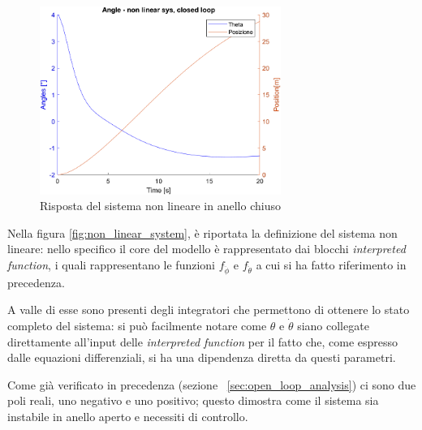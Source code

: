\begin{figure}[H]
	\centering   	
	\includegraphics[width=0.7\textwidth]{Immagini/closed_loop_non_linear.png}
	\caption{Risposta del sistema non lineare in anello chiuso}
	\label{fig:closed_loop_non_linear_response}
\end{figure}

Nella figura \ref{fig:non_linear_system}, è riportata la definizione del sistema non lineare: nello specifico il core del modello è rappresentato dai blocchi \textit{interpreted function}, i quali rappresentano le funzioni  $f_{\ddot{\phi}}$ e $f_{\ddot{\theta}}$ a cui si ha fatto riferimento in precedenza.

A valle di esse sono presenti degli integratori che permettono di ottenere lo stato completo del sistema: si può facilmente notare come $\theta$ e $\dot{\theta}$ siano collegate direttamente all'input delle \textit{interpreted function} per il fatto che, come espresso dalle equazioni differenziali, si ha una dipendenza diretta da questi parametri.

Come già verificato in precedenza (sezione ~\ref{sec:open_loop_analysis}) ci sono due poli reali, uno negativo e uno positivo; questo dimostra come il sistema sia instabile in anello aperto e necessiti di controllo.

